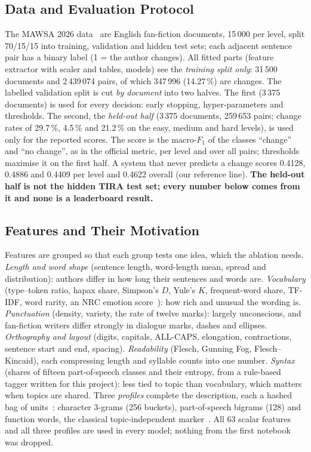 \documentclass[runningheads]{llncs}
\begin{document}
\subsection{Data and Evaluation Protocol}

The MAWSA 2026 data~\cite{zangerle_2026_19068843,zangerle:2026} are English fan-fiction documents, 15\,000 per level, split 70/15/15 into training, validation and hidden test sets; each adjacent sentence pair has a binary label (1 = the author changes). All fitted parts (feature extractor with scaler and tables, models) see the \emph{training split only}: 31\,500 documents and 2\,439\,074 pairs, of which 347\,996 (14.27\,\%) are changes. The labelled validation split is cut \emph{by document} into two halves. The first (3\,375 documents) is used for every decision: early stopping, hyper-parameters and thresholds. The second, the \emph{held-out half} (3\,375 documents, 259\,653 pairs; change rates of 29.7\,\%, 4.5\,\% and 21.2\,\% on the easy, medium and hard levels), is used only for the reported scores. The score is the macro-$F_1$ of the classes ``change'' and ``no change'', as in the official metric, per level and over all pairs; thresholds maximise it on the first half. A system that never predicts a change scores 0.4128, 0.4886 and 0.4409 per level and 0.4622 overall (our reference line). \textbf{The held-out half is not the hidden TIRA test set; every number below comes from it and none is a leaderboard result.}

\subsection{Features and Their Motivation}

Features are grouped so that each group tests one idea, which the ablation needs. \emph{Length and word shape} (sentence length, word-length mean, spread and distribution): authors differ in how long their sentences and words are. \emph{Vocabulary} (type--token ratio, hapax share, Simpson's $D$, Yule's $K$, frequent-word share, TF-IDF, word rarity, an NRC emotion score~\cite{mohammad2013crowdsourcing}): how rich and unusual the wording is. \emph{Punctuation} (density, variety, the rate of twelve marks): largely unconscious, and fan-fiction writers differ strongly in dialogue marks, dashes and ellipses. \emph{Orthography and layout} (digits, capitals, ALL-CAPS, elongation, contractions, sentence start and end, spacing). \emph{Readability} (Flesch, Gunning Fog, Flesch--Kincaid), each compressing length and syllable counts into one number. \emph{Syntax} (shares of fifteen part-of-speech classes and their entropy, from a rule-based tagger written for this project): less tied to topic than vocabulary, which matters when topics are shared. Three \emph{profiles} complete the description, each a hashed bag of units~\cite{weinberger2009hashing}: character 3-grams (256 buckets), part-of-speech bigrams (128) and function words, the classical topic-independent marker~\cite{mosteller1964inference}. All 63 scalar features and all three profiles are used in every model; nothing from the first notebook was dropped.
\end{document}
